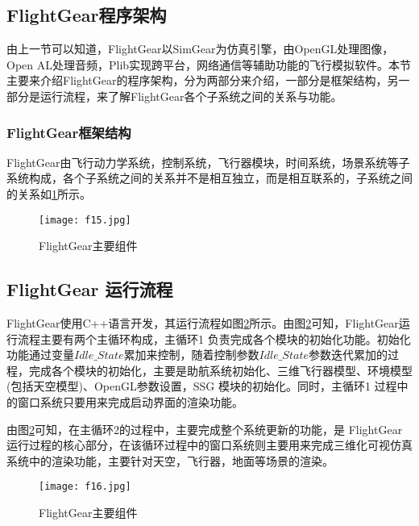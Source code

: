 \begin{itemize}
\begin{table}[h]
\begin{center}
\begin{longtable}{ | c| p{5cm}|}
\\\hline
\end{longtable}
\end{center}
\end{table}
\end{itemize}
\vspace{-10pt}
\subsection{FlightGear程序架构}
\vspace{10pt}
由上一节可以知道，FlightGear以SimGear为仿真引擎，由OpenGL处理图像，Open AL处理音频，Plib实现跨平台，网络通信等辅助功能的飞行模拟软件。本节主要来介绍FlightGear的程序架构，分为两部分来介绍，一部分是框架结构，另一部分是运行流程，来了解FlightGear各个子系统之间的关系与功能。
\subsubsection{FlightGear框架结构}
\vspace{10pt}
FlightGear由飞行动力学系统，控制系统，飞行器模块，时间系统，场景系统等子系统构成，各个子系统之间的关系并不是相互独立，而是相互联系的，子系统之间的关系如\ref{fig11}所示。
\begin{figure}[!ht]
\centering
\texttt{[image: f15.jpg]}
\caption{FlightGear主要组件}
\label{fig11}
\end{figure}
\subsection{ FlightGear 运行流程}
FlightGear使用C++语言开发，其运行流程如图\ref{fig12}所示。由图\ref{fig12}可知，FlightGear运行流程主要有两个主循环构成，主循环1 负责完成各个模块的初始化功能。初始化功能通过变量$Idle\_State$累加来控制，随着控制参数$Idle\_State$参数迭代累加的过程，完成各个模块的初始化，主要是助航系统初始化、三维飞行器模型、环境模型(包括天空模型)、OpenGL参数设置，SSG 模块的初始化。同时，主循环1 过程中的窗口系统只要用来完成启动界面的渲染功能。

由图\ref{fig12}可知，在主循环2的过程中，主要完成整个系统更新的功能，是
FlightGear运行过程的核心部分，在该循环过程中的窗口系统则主要用来完成三维化可视仿真系统中的渲染功能，主要针对天空，飞行器，地面等场景的渲染。
\begin{figure}[!ht]
\centering
\texttt{[image: f16.jpg]}
\caption{FlightGear主要组件}
\label{fig12}
\end{figure}
